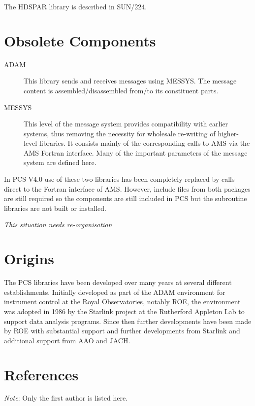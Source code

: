 \documentclass[twoside,11pt]{article}
\newcommand{\htmladdnormallink}[2]{#1}
\newcommand{\xref}[3]{#1}
\newcommand{\xlabel}[1]{}
\renewcommand{\_}{\texttt{\symbol{95}}}
\newcommand{\ROEURL}{http://www.roe.ac.uk/}
\newcommand{\STARURL}{http://www.starlink.rl.ac.uk/}
\newcommand{\RALURL}{http://www.clrc.ac.uk/}
\newcommand{\AAOURL}{http://www.aao.gov.au/}
\newcommand{\JACHURL}{http://www.jach.hawaii.edu/}
\begin{document}
The HDSPAR library is described in
\xref{SUN/224}{sun224}{}.

\section{\xlabel{obsolete_components}Obsolete Components}

\begin{description}
\item[ADAM] This library sends and receives messages using MESSYS.
The message content is assembled/disassembled from/to its constituent parts.
\item[MESSYS] This level of the message system provides compatibility with
earlier systems, thus removing the necessity for wholesale re-writing of 
higher-level libraries. It consists mainly of the corresponding calls to AMS
via the AMS Fortran interface. Many of the important parameters of the message 
system are defined here.
\end{description}

In PCS V4.0 use of these two libraries has been completely replaced by
calls direct to the Fortran interface of AMS. However, include files from both
packages are still required so the components are still included in PCS but
the subroutine libraries are not built or installed. 

\emph{This situation needs re-organisation}

\section{\xlabel{origins}Origins}
The PCS libraries have been developed over many years at several different 
establishments. Initially developed as part of the ADAM environment for 
instrument control at the Royal Observatories, notably 
\htmladdnormallink{ROE}{\ROEURL}, 
the environment was adopted in 1986 by the 
\htmladdnormallink{Starlink}{\STARURL}
project at the
\htmladdnormallink{Rutherford Appleton Lab}{\RALURL} 
to support data analysis programs.
Since then further developments have been made by ROE with substantial support 
and further developments from Starlink and additional support from 
\htmladdnormallink{AAO}{\AAOURL}
and 
\htmladdnormallink{JACH}{\JACHURL}.

\section{\xlabel{references}References}
{\em Note}: Only the first author is listed here.
\end{document}
